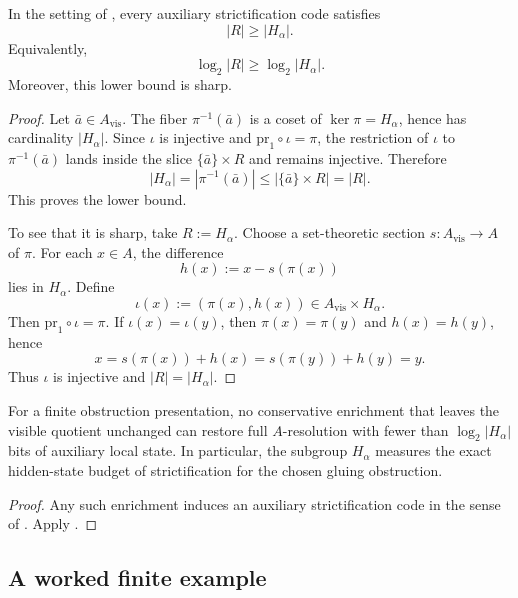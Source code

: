 \begin{theorem}\label{thm:minimal-information-cost-of-strictification}
In the setting of , every auxiliary strictification code satisfies
\[
|R|\ge |H_\alpha|.
\]
Equivalently,
\[
\log_2 |R|\ge \log_2 |H_\alpha|.
\]
Moreover, this lower bound is sharp.
\end{theorem}

\begin{proof}
Let $\bar a\in A_{\mathrm{vis}}$. The fiber $\pi^{-1}(\bar a)$ is a coset of $\ker\pi=H_\alpha$, hence has cardinality $|H_\alpha|$. Since $\iota$ is injective and $\mathrm{pr}_1\circ\iota=\pi$, the restriction of $\iota$ to $\pi^{-1}(\bar a)$ lands inside the slice $\{\bar a\}\times R$ and remains injective. Therefore
\[
|H_\alpha|=|\pi^{-1}(\bar a)|\le |\{\bar a\}\times R|=|R|.
\]
This proves the lower bound.

To see that it is sharp, take $R:=H_\alpha$. Choose a set-theoretic section $s:A_{\mathrm{vis}}\to A$ of $\pi$. For each $x\in A$, the difference
\[
h(x):=x-s(\pi(x))
\]
lies in $H_\alpha$. Define
\[
\iota(x):=(\pi(x),h(x))\in A_{\mathrm{vis}}\times H_\alpha.
\]
Then $\mathrm{pr}_1\circ\iota=\pi$. If $\iota(x)=\iota(y)$, then $\pi(x)=\pi(y)$ and $h(x)=h(y)$, hence
\[
x=s(\pi(x))+h(x)=s(\pi(y))+h(y)=y.
\]
Thus $\iota$ is injective and $|R|=|H_\alpha|$.
\end{proof}

\begin{corollary}\label{cor:conservative-recovery-budget}
For a finite obstruction presentation, no conservative enrichment that leaves the visible quotient unchanged can restore full $A$-resolution with fewer than $\log_2|H_\alpha|$ bits of auxiliary local state. In particular, the subgroup $H_\alpha$ measures the exact hidden-state budget of strictification for the chosen gluing obstruction.
\end{corollary}

\begin{proof}
Any such enrichment induces an auxiliary strictification code in the sense of . Apply .
\end{proof}

\subsection{A worked finite example}

